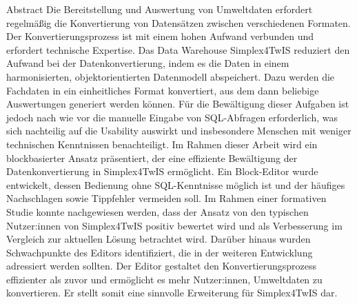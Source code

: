 \vspace*{0pt plus 1fill}
\begin{tucsimplesection}{Abstract}
  Die Bereitstellung und Auswertung von Umweltdaten erfordert regelmäßig die Konvertierung von Datensätzen zwischen verschiedenen Formaten. Der Konvertierungsprozess ist mit einem hohen Aufwand verbunden und erfordert technische Expertise.
  Das Data Warehouse Simplex4TwIS reduziert den Aufwand bei der Datenkonvertierung, indem es die Daten in einem harmonisierten, objektorientierten Datenmodell abspeichert. Dazu werden die Fachdaten in ein einheitliches Format konvertiert, aus dem dann beliebige Auswertungen generiert werden können.
  Für die Bewältigung dieser Aufgaben ist jedoch nach wie vor die manuelle Eingabe von \acs{SQL}-Abfragen erforderlich, was sich nachteilig auf die Usability auswirkt und insbesondere Menschen mit weniger technischen Kenntnissen benachteiligt.
  Im Rahmen dieser Arbeit wird ein blockbasierter Ansatz präsentiert, der eine effiziente Bewältigung der Datenkonvertierung in Simplex4TwIS ermöglicht.
  Ein Block-Editor wurde entwickelt, dessen Bedienung ohne \acs{SQL}-Kenntnisse möglich ist und der häufiges Nachschlagen sowie Tippfehler vermeiden soll. Im Rahmen einer formativen Studie konnte nachgewiesen werden, dass der Ansatz von den typischen Nutzer:innen von Simplex4TwIS positiv bewertet wird und als Verbesserung im Vergleich zur aktuellen Lösung betrachtet wird. Darüber hinaus wurden Schwachpunkte des Editors identifiziert, die in der weiteren Entwicklung adressiert werden sollten.
  Der Editor gestaltet den Konvertierungsprozess effizienter als zuvor und ermöglicht es mehr Nutzer:innen, Umweltdaten zu konvertieren. Er stellt somit eine sinnvolle Erweiterung für Simplex4TwIS dar.
\end{tucsimplesection}
\vspace*{0pt plus 2.5fill}
